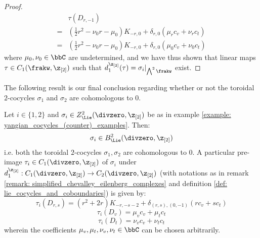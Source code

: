 \begin{proof}
$$\begin{aligned}
                            & \tau( D_{r, -1} )
                            \\
                            = & \left( \frac12 r^2 - \nu_0 r - \mu_0 \right) K_{-r, 0} + \delta_{r, 0} ( \mu_r c_v + \nu_r c_t )
                            \\
                            = & \left( \frac12 r^2 - \nu_0 r - \mu_0 \right) K_{-r, 0} + \delta_{r, 0} ( \mu_0 c_v + \nu_0 c_t )
                        \end{aligned}
                    $$
                where $\mu_0, \nu_0 \in \bbC$ are undetermined, and we have thus shown that linear maps $\tau \in C_1(\frakw, \z_{[2]})$ such that $d_1^{\z_{[2]}}(\tau) = \sigma_i|_{\bigwedge^2 \frakw}$ exist.
            \end{proof}

        The following result is our final conclusion regarding whether or not the toroidal $2$-cocycles $\sigma_1$ and $\sigma_2$ are cohomologous to $0$.
        \begin{theorem} \label{theorem: non_trivial_yangian_cocycles_examples}
            Let $i \in \{1, 2\}$ and $\sigma_i \in Z^2_{\Lie}(\divzero, \z_{[2]})$ be as in example \ref{example: yangian_cocycles_(counter)_examples}. Then:
                $$\sigma_i \in B^2_{\Lie}(\divzero, \z_{[2]})$$
            i.e. both the toroidal $2$-cocycles $\sigma_1, \sigma_2$ are cohomologous to $0$. A particular pre-image $\tau_i \in C_1(\divzero, \z_{[2]})$ of $\sigma_i$ under $d_1^{\z_{[2]}}: C_1(\divzero, \z_{[2]}) \to C_2(\divzero, \z_{[2]})$ (with notations as in remark \ref{remark: simplified_chevalley_eilenberg_complexes} and definition \ref{def: lie_cocycles_and_coboundaries}) is given by:
                $$\tau_i(D_{r, s}) = ( r^2 + 2r ) K_{-r, -s - 2} + \delta_{(r, s), (0, -1)} ( r c_v + s c_t )$$
                $$\tau_i(D_v) = \mu_v c_v + \mu_t c_t$$
                $$\tau_i(D_t) = \nu_v c_v + \nu_t c_t$$
            wherein the coefficients $\mu_v, \mu_t, \nu_v, \nu_t \in \bbC$ can be chosen arbitrarily.
        \end{theorem}
